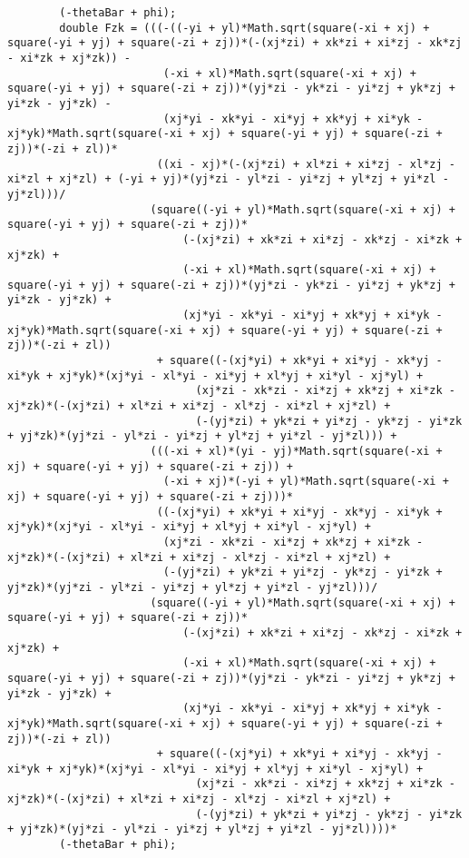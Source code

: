 \begin{lstlisting}
		(-thetaBar + phi);
		double Fzk = (((-((-yi + yl)*Math.sqrt(square(-xi + xj) + square(-yi + yj) + square(-zi + zj))*(-(xj*zi) + xk*zi + xi*zj - xk*zj - xi*zk + xj*zk)) - 
						(-xi + xl)*Math.sqrt(square(-xi + xj) + square(-yi + yj) + square(-zi + zj))*(yj*zi - yk*zi - yi*zj + yk*zj + yi*zk - yj*zk) - 
						(xj*yi - xk*yi - xi*yj + xk*yj + xi*yk - xj*yk)*Math.sqrt(square(-xi + xj) + square(-yi + yj) + square(-zi + zj))*(-zi + zl))*
					   ((xi - xj)*(-(xj*zi) + xl*zi + xi*zj - xl*zj - xi*zl + xj*zl) + (-yi + yj)*(yj*zi - yl*zi - yi*zj + yl*zj + yi*zl - yj*zl)))/
					  (square((-yi + yl)*Math.sqrt(square(-xi + xj) + square(-yi + yj) + square(-zi + zj))*
						   (-(xj*zi) + xk*zi + xi*zj - xk*zj - xi*zk + xj*zk) + 
						   (-xi + xl)*Math.sqrt(square(-xi + xj) + square(-yi + yj) + square(-zi + zj))*(yj*zi - yk*zi - yi*zj + yk*zj + yi*zk - yj*zk) + 
						   (xj*yi - xk*yi - xi*yj + xk*yj + xi*yk - xj*yk)*Math.sqrt(square(-xi + xj) + square(-yi + yj) + square(-zi + zj))*(-zi + zl))
					   + square((-(xj*yi) + xk*yi + xi*yj - xk*yj - xi*yk + xj*yk)*(xj*yi - xl*yi - xi*yj + xl*yj + xi*yl - xj*yl) + 
							 (xj*zi - xk*zi - xi*zj + xk*zj + xi*zk - xj*zk)*(-(xj*zi) + xl*zi + xi*zj - xl*zj - xi*zl + xj*zl) + 
							 (-(yj*zi) + yk*zi + yi*zj - yk*zj - yi*zk + yj*zk)*(yj*zi - yl*zi - yi*zj + yl*zj + yi*zl - yj*zl))) + 
					  (((-xi + xl)*(yi - yj)*Math.sqrt(square(-xi + xj) + square(-yi + yj) + square(-zi + zj)) + 
						(-xi + xj)*(-yi + yl)*Math.sqrt(square(-xi + xj) + square(-yi + yj) + square(-zi + zj)))*
					   ((-(xj*yi) + xk*yi + xi*yj - xk*yj - xi*yk + xj*yk)*(xj*yi - xl*yi - xi*yj + xl*yj + xi*yl - xj*yl) + 
						(xj*zi - xk*zi - xi*zj + xk*zj + xi*zk - xj*zk)*(-(xj*zi) + xl*zi + xi*zj - xl*zj - xi*zl + xj*zl) + 
						(-(yj*zi) + yk*zi + yi*zj - yk*zj - yi*zk + yj*zk)*(yj*zi - yl*zi - yi*zj + yl*zj + yi*zl - yj*zl)))/
					  (square((-yi + yl)*Math.sqrt(square(-xi + xj) + square(-yi + yj) + square(-zi + zj))*
						   (-(xj*zi) + xk*zi + xi*zj - xk*zj - xi*zk + xj*zk) + 
						   (-xi + xl)*Math.sqrt(square(-xi + xj) + square(-yi + yj) + square(-zi + zj))*(yj*zi - yk*zi - yi*zj + yk*zj + yi*zk - yj*zk) + 
						   (xj*yi - xk*yi - xi*yj + xk*yj + xi*yk - xj*yk)*Math.sqrt(square(-xi + xj) + square(-yi + yj) + square(-zi + zj))*(-zi + zl))
					   + square((-(xj*yi) + xk*yi + xi*yj - xk*yj - xi*yk + xj*yk)*(xj*yi - xl*yi - xi*yj + xl*yj + xi*yl - xj*yl) + 
							 (xj*zi - xk*zi - xi*zj + xk*zj + xi*zk - xj*zk)*(-(xj*zi) + xl*zi + xi*zj - xl*zj - xi*zl + xj*zl) + 
							 (-(yj*zi) + yk*zi + yi*zj - yk*zj - yi*zk + yj*zk)*(yj*zi - yl*zi - yi*zj + yl*zj + yi*zl - yj*zl))))*
		(-thetaBar + phi);
		

\end{lstlisting}
